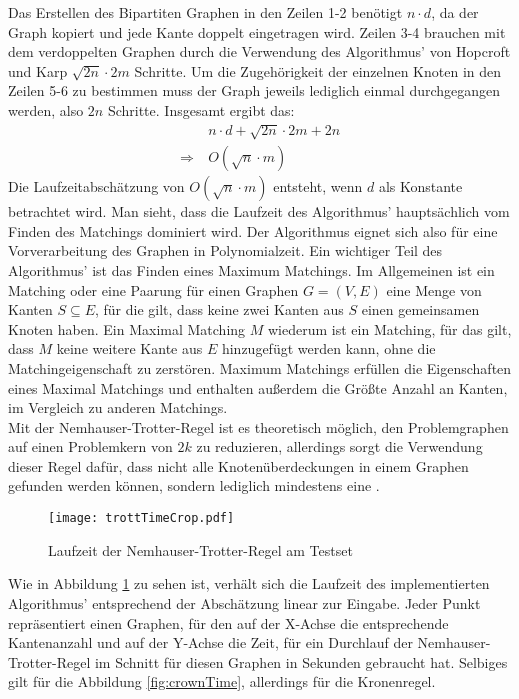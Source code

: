 Das Erstellen des Bipartiten Graphen in den Zeilen 1-2 benötigt $n \cdot d$, da der Graph kopiert und jede Kante doppelt eingetragen wird. Zeilen 3-4 brauchen mit dem verdoppelten Graphen durch die Verwendung des Algorithmus' von Hopcroft und Karp $\sqrt{2n} \cdot 2m$ Schritte. Um die Zugehörigkeit der einzelnen Knoten in den Zeilen 5-6 zu bestimmen muss der Graph jeweils lediglich einmal durchgegangen werden, also $2n$ Schritte. Insgesamt ergibt das:
\begin{align}
&\ n \cdot d + \sqrt{2n} \cdot 2m + 2n\\
\Rightarrow &\ O(\sqrt{n} \cdot m)
\end{align}
Die Laufzeitabschätzung von  $O(\sqrt{n} \cdot m)$ entsteht, wenn $d$ als Konstante betrachtet wird. Man sieht, dass die Laufzeit des Algorithmus' hauptsächlich vom Finden des Matchings dominiert wird. Der Algorithmus eignet sich also für eine Vorverarbeitung des Graphen in Polynomialzeit.
Ein wichtiger Teil des Algorithmus' ist das Finden eines Maximum Matchings. Im Allgemeinen ist ein Matching oder eine Paarung für einen Graphen $G=(V,E)$ eine Menge von Kanten $S \subseteq E$, für die gilt, dass keine zwei Kanten aus $S$ einen gemeinsamen Knoten haben. Ein Maximal Matching $M$ wiederum ist ein Matching, für das gilt, dass $M$ keine weitere Kante aus $E$ hinzugefügt werden kann, ohne die Matchingeigenschaft zu zerstören. Maximum Matchings erfüllen die Eigenschaften eines Maximal Matchings und enthalten außerdem die Größte Anzahl an Kanten, im Vergleich zu anderen Matchings.\\
Mit der Nemhauser-Trotter-Regel ist es theoretisch möglich, den Problemgraphen auf einen Problemkern von $2k$ zu reduzieren, allerdings sorgt die Verwendung dieser Regel dafür, dass nicht alle Knotenüberdeckungen in einem Graphen gefunden werden können, sondern lediglich mindestens eine \cite{fixed}.
\begin{figure}[htb]
\centering
  	{\texttt{[image: trottTimeCrop.pdf]}}
	\caption{Laufzeit der Nemhauser-Trotter-Regel am Testset\label{fig:trottTime}}
\centering
\end{figure}Wie in Abbildung \ref{fig:trottTime} zu sehen ist, verhält sich die Laufzeit des implementierten Algorithmus' entsprechend der Abschätzung linear zur Eingabe. Jeder Punkt repräsentiert einen Graphen, für den auf der X-Achse die entsprechende Kantenanzahl und auf der Y-Achse die Zeit, für ein Durchlauf der Nemhauser-Trotter-Regel im Schnitt für diesen Graphen in Sekunden gebraucht hat. Selbiges gilt für die Abbildung \ref{fig:crownTime}, allerdings für die Kronenregel.
